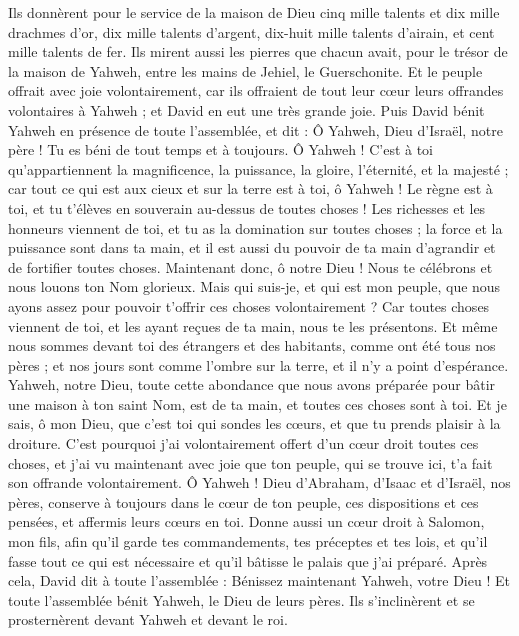 \begin{multicols}{2}
Ils donnèrent pour le service de la maison de Dieu cinq mille talents et dix mille drachmes d'or, dix mille talents d'argent, dix-huit mille talents d'airain, et cent mille talents de fer.
Ils mirent aussi les pierres que chacun avait, pour le trésor de la maison de Yahweh, entre les mains de Jehiel, le Guerschonite.
Et le peuple offrait avec joie volontairement, car ils offraient de tout leur cœur leurs offrandes volontaires à Yahweh ; et David en eut une très grande joie.
Puis David bénit Yahweh en présence de toute l'assemblée, et dit : Ô Yahweh, Dieu d'Israël, notre père ! Tu es béni de tout temps et à toujours.
Ô Yahweh ! C'est à toi qu'appartiennent la magnificence, la puissance, la gloire, l'éternité, et la majesté ; car tout ce qui est aux cieux et sur la terre est à toi, ô Yahweh ! Le règne est à toi, et tu t'élèves en souverain au-dessus de toutes choses !
Les richesses et les honneurs viennent de toi, et tu as la domination sur toutes choses ; la force et la puissance sont dans ta main, et il est aussi du pouvoir de ta main d'agrandir et de fortifier toutes choses.
Maintenant donc, ô notre Dieu ! Nous te célébrons et nous louons ton Nom glorieux.
Mais qui suis-je, et qui est mon peuple, que nous ayons assez pour pouvoir t'offrir ces choses volontairement ? Car toutes choses viennent de toi, et les ayant reçues de ta main, nous te les présentons.
Et même nous sommes devant toi des étrangers et des habitants, comme ont été tous nos pères ; et nos jours sont comme l'ombre sur la terre, et il n'y a point d'espérance.
Yahweh, notre Dieu, toute cette abondance que nous avons préparée pour bâtir une maison à ton saint Nom, est de ta main, et toutes ces choses sont à toi.
Et je sais, ô mon Dieu, que c'est toi qui sondes les cœurs, et que tu prends plaisir à la droiture. C'est pourquoi j'ai volontairement offert d'un cœur droit toutes ces choses, et j'ai vu maintenant avec joie que ton peuple, qui se trouve ici, t'a fait son offrande volontairement.
Ô Yahweh ! Dieu d'Abraham, d'Isaac et d'Israël, nos pères, conserve à toujours dans le cœur de ton peuple, ces dispositions et ces pensées, et affermis leurs cœurs en toi.
Donne aussi un cœur droit à Salomon, mon fils, afin qu'il garde tes commandements, tes préceptes et tes lois, et qu'il fasse tout ce qui est nécessaire et qu'il bâtisse le palais que j'ai préparé.
Après cela, David dit à toute l'assemblée : Bénissez maintenant Yahweh, votre Dieu ! Et toute l'assemblée bénit Yahweh, le Dieu de leurs pères. Ils s'inclinèrent et se prosternèrent devant Yahweh et devant le roi.

\end{multicols}
